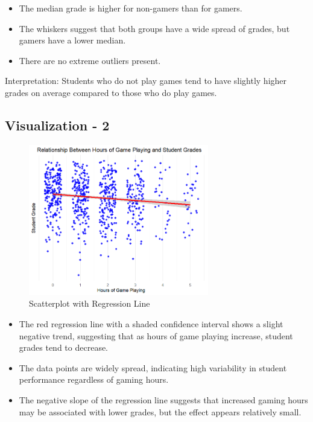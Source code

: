 \documentclass{article}
\begin{document}
\begin{itemize}
    \item The median grade is higher for non-gamers than for gamers.
    \item The whiskers suggest that both groups have a wide spread of grades, but gamers have a lower median.
    \item There are no extreme outliers present.
\end{itemize}

Interpretation: Students who do not play games tend to have slightly higher grades on average compared to those who do play games.

\vspace{20pt}

\subsection{Visualization - 2}

\begin{figure}[h]
    \centering
    \includegraphics[width=0.7\textwidth]{PS6b_Bermudez.png}
    \caption{Scatterplot with Regression Line}
    \label{fig:grade_distribution2}
\end{figure}

\begin{itemize}
    \item The red regression line with a shaded confidence interval shows a slight negative trend, suggesting that as hours of game playing increase, student grades tend to decrease.
    \item The data points are widely spread, indicating high variability in student performance regardless of gaming hours.
    \item The negative slope of the regression line suggests that increased gaming hours may be associated with lower grades, but the effect appears relatively small.
\end{itemize}
\end{document}
